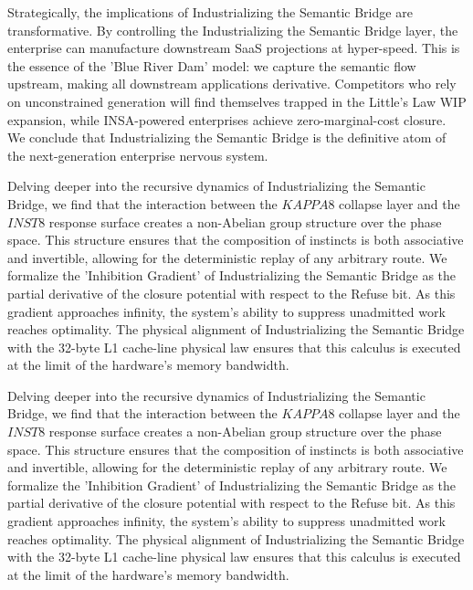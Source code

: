 \documentclass[12pt,a4paper,oneside]{book}
\begin{document}
Strategically, the implications of Industrializing the Semantic Bridge are transformative. By controlling the Industrializing the Semantic Bridge layer, the enterprise can manufacture downstream SaaS projections at hyper-speed. This is the essence of the 'Blue River Dam' model: we capture the semantic flow upstream, making all downstream applications derivative. Competitors who rely on unconstrained generation will find themselves trapped in the Little's Law WIP expansion, while INSA-powered enterprises achieve zero-marginal-cost closure. We conclude that Industrializing the Semantic Bridge is the definitive atom of the next-generation enterprise nervous system. 

Delving deeper into the recursive dynamics of Industrializing the Semantic Bridge, we find that the interaction between the $KAPPA8$ collapse layer and the $INST8$ response surface creates a non-Abelian group structure over the phase space. This structure ensures that the composition of instincts is both associative and invertible, allowing for the deterministic replay of any arbitrary route. We formalize the 'Inhibition Gradient' of Industrializing the Semantic Bridge as the partial derivative of the closure potential with respect to the Refuse bit. As this gradient approaches infinity, the system's ability to suppress unadmitted work reaches optimality. The physical alignment of Industrializing the Semantic Bridge with the 32-byte L1 cache-line physical law ensures that this calculus is executed at the limit of the hardware's memory bandwidth. 

Delving deeper into the recursive dynamics of Industrializing the Semantic Bridge, we find that the interaction between the $KAPPA8$ collapse layer and the $INST8$ response surface creates a non-Abelian group structure over the phase space. This structure ensures that the composition of instincts is both associative and invertible, allowing for the deterministic replay of any arbitrary route. We formalize the 'Inhibition Gradient' of Industrializing the Semantic Bridge as the partial derivative of the closure potential with respect to the Refuse bit. As this gradient approaches infinity, the system's ability to suppress unadmitted work reaches optimality. The physical alignment of Industrializing the Semantic Bridge with the 32-byte L1 cache-line physical law ensures that this calculus is executed at the limit of the hardware's memory bandwidth. 
\end{document}
